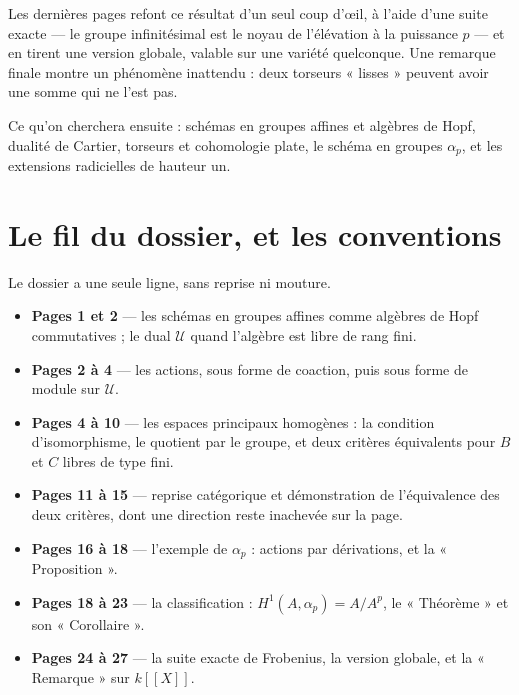 \documentclass[11pt,a4paper]{article}
\begin{document}
\begin{resume}
Les dernières pages refont ce résultat d'un seul coup d'œil, à l'aide d'une
suite exacte --- le groupe infinitésimal est le noyau de l'élévation à la
puissance $p$ --- et en tirent une version globale, valable sur une variété
quelconque. Une remarque finale montre un phénomène inattendu : deux torseurs
« lisses » peuvent avoir une somme qui ne l'est pas.

Ce qu'on cherchera ensuite : schémas en groupes affines et algèbres de Hopf,
dualité de Cartier, torseurs et cohomologie plate, le schéma en groupes
$\alpha_p$, et les extensions radicielles de hauteur un.

\end{resume}

\section*{Le fil du dossier, et les conventions}

Le dossier a une seule ligne, sans reprise ni mouture.

\begin{itemize}
\item \textbf{Pages 1 et 2} --- les schémas en groupes affines comme
algèbres de Hopf commutatives ; le dual $\mathcal{U}$ quand l'algèbre est
libre de rang fini.
\item \textbf{Pages 2 à 4} --- les actions, sous forme de coaction, puis sous
forme de module sur $\mathcal{U}$.
\item \textbf{Pages 4 à 10} --- les espaces principaux homogènes : la
condition d'isomorphisme, le quotient par le groupe, et deux critères
équivalents pour $B$ et $C$ libres de type fini.
\item \textbf{Pages 11 à 15} --- reprise catégorique et démonstration de
l'équivalence des deux critères, dont une direction reste inachevée sur la
page.
\item \textbf{Pages 16 à 18} --- l'exemple de $\alpha_p$ : actions par
dérivations, et la « Proposition ».
\item \textbf{Pages 18 à 23} --- la classification : $H^1(A,\alpha_p) = A/A^p$,
le « Théorème » et son « Corollaire ».
\item \textbf{Pages 24 à 27} --- la suite exacte de Frobenius, la version
globale, et la « Remarque » sur $k[[X]]$.
\end{itemize}
\end{document}
